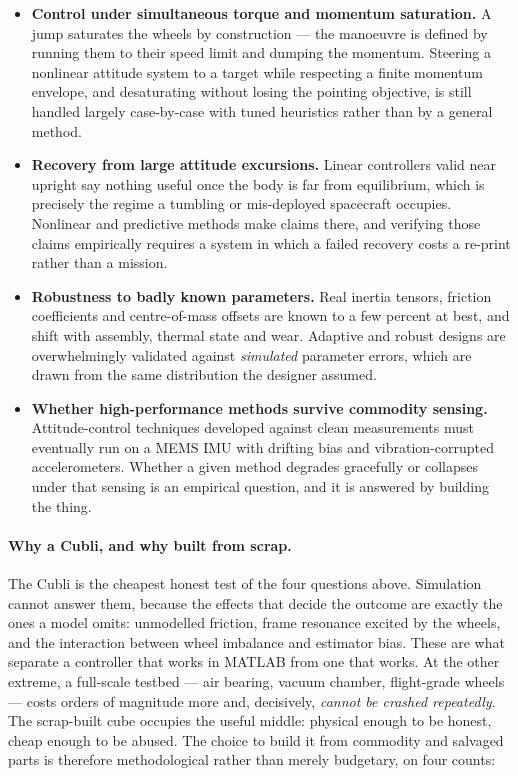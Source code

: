 \begin{itemize}
    \item \textbf{Control under simultaneous torque and momentum saturation.} A jump saturates the wheels by construction --- the manoeuvre is defined by running them to their speed limit and dumping the momentum. Steering a nonlinear attitude system to a target while respecting a finite momentum envelope, and desaturating without losing the pointing objective, is still handled largely case-by-case with tuned heuristics rather than by a general method.
    \item \textbf{Recovery from large attitude excursions.} Linear controllers valid near upright say nothing useful once the body is far from equilibrium, which is precisely the regime a tumbling or mis-deployed spacecraft occupies. Nonlinear and predictive methods make claims there, and verifying those claims empirically requires a system in which a failed recovery costs a re-print rather than a mission.
    \item \textbf{Robustness to badly known parameters.} Real inertia tensors, friction coefficients and centre-of-mass offsets are known to a few percent at best, and shift with assembly, thermal state and wear. Adaptive and robust designs are overwhelmingly validated against \emph{simulated} parameter errors, which are drawn from the same distribution the designer assumed.
    \item \textbf{Whether high-performance methods survive commodity sensing.} Attitude-control techniques developed against clean measurements must eventually run on a MEMS IMU with drifting bias and vibration-corrupted accelerometers. Whether a given method degrades gracefully or collapses under that sensing is an empirical question, and it is answered by building the thing.
\end{itemize}

\paragraph{Why a Cubli, and why built from scrap.} The Cubli is the cheapest honest test of the four questions above. Simulation cannot answer them, because the effects that decide the outcome are exactly the ones a model omits: unmodelled friction, frame resonance excited by the wheels, and the interaction between wheel imbalance and estimator bias. These are what separate a controller that works in MATLAB from one that works. At the other extreme, a full-scale testbed --- air bearing, vacuum chamber, flight-grade wheels --- costs orders of magnitude more and, decisively, \emph{cannot be crashed repeatedly}. The scrap-built cube occupies the useful middle: physical enough to be honest, cheap enough to be abused. The choice to build it from commodity and salvaged parts is therefore methodological rather than merely budgetary, on four counts:

